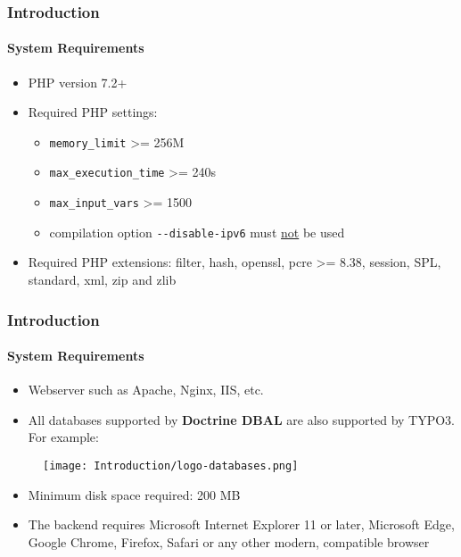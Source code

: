 \begin{frame}[fragile]
	\frametitle{Introduction}
	\framesubtitle{System Requirements}

	\begin{itemize}
		\item PHP version 7.2+
		\item Required PHP settings:

			\begin{itemize}
				\item \texttt{memory\_limit} >= 256M
				\item \texttt{max\_execution\_time} >= 240s
				\item \texttt{max\_input\_vars} >= 1500
				\item compilation option \texttt{-}\texttt{-disable-ipv6} must \underline{not} be used
			\end{itemize}

		\item Required PHP extensions:\newline
			\small
				filter, hash, openssl, pcre >= 8.38, session, SPL, standard,
				xml, zip and zlib
			\normalsize
	\end{itemize}

\end{frame}


\begin{frame}[fragile]
	\frametitle{Introduction}
	\framesubtitle{System Requirements}

	\begin{itemize}
		\item Webserver such as Apache, Nginx, IIS, etc.
		\item All databases supported by \textbf{Doctrine DBAL} are also
			supported by TYPO3. For example:
	\end{itemize}

	\begin{figure}
		\texttt{[image: Introduction/logo-databases.png]}
	\end{figure}

	\begin{itemize}
		\item Minimum disk space required: 200 MB
		\item The backend requires Microsoft Internet Explorer 11 or later,
			Microsoft Edge, Google Chrome, Firefox, Safari or any other modern,
			compatible browser
	\end{itemize}

\end{frame}

